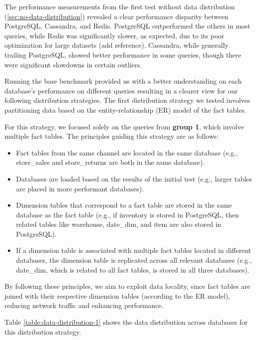 \documentclass[conference]{IEEEtran}
\begin{document}
The performance measurements from the first test without data distribution (\ref{sec:no-data-distribution})
revealed a clear performance disparity between PostgreSQL, Cassandra, and Redis. PostgreSQL outperformed
the others in most queries, while Redis was significantly slower, as expected, due to its poor optimization
for large datasets (add reference). Cassandra, while generally trailing PostgreSQL, showed better performance
in some queries, though there were significant slowdowns in certain outliers.

Running the base benchmark provided us with a better understanding on each database's performance on
different queries resulting in a clearer view for our following distribution strategies.
The first distribution strategy we tested involves partitioning data based on the entity-relationship
(ER) model of the fact tables.

For this strategy, we focused solely on the queries from \textbf{group 1}, which involve multiple fact tables.
The principles guiding this strategy are as follows:
\begin{itemize}
	\item Fact tables from the same channel are located in the same database (e.g., store\_sales and store\_returns are both in the same database).
	\item Databases are loaded based on the results of the initial test (e.g., larger tables are placed in more performant databases).
	\item Dimension tables that correspond to a fact table are stored in the same database as the fact table (e.g., if inventory is stored in PostgreSQL, then related tables like warehouse, date\_dim, and item are also stored in PostgreSQL).
	\item If a dimension table is associated with multiple fact tables located in different databases, the dimension table is replicated across all relevant databases (e.g., date\_dim, which is related to all fact tables, is stored in all three databases).
\end{itemize}

By following these principles, we aim to exploit data locality, since fact tables are joined with their
respective dimension tables (according to the ER model), reducing network traffic and enhancing performance.

Table \ref{table:data-distribution-1} shows the data distribution across databases for this distribution strategy.
\end{document}
